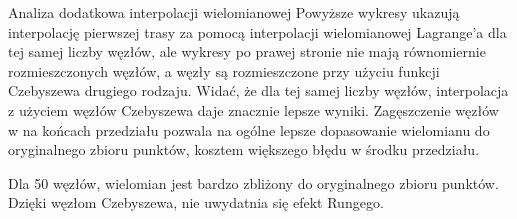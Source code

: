 \documentclass{article}
\begin{document}
\begin{section}{Analiza dodatkowa interpolacji wielomianowej}
  Powyższe wykresy ukazują interpolację pierwszej trasy za pomocą interpolacji wielomianowej Lagrange'a dla tej samej liczby
  węzłów, ale wykresy po prawej stronie nie mają równomiernie rozmieszczonych węzłów, a węzły są rozmieszczone
  przy użyciu funkcji Czebyszewa drugiego rodzaju. Widać, że dla tej samej liczby węzłów, interpolacja z użyciem
  węzłów Czebyszewa daje znacznie lepsze wyniki. Zagęszczenie węzłów w na końcach przedziału pozwala na ogólne
  lepsze dopasowanie wielomianu do oryginalnego zbioru punktów, kosztem większego błędu w środku przedziału.

  Dla 50 węzłów, wielomian jest bardzo zbliżony do oryginalnego zbioru punktów. Dzięki węzłom Czebyszewa, nie uwydatnia
  się efekt Rungego.

  \begin{figure}[H]
    \centering
  \end{figure}
  \begin{figure}[H]
    \centering

\end{figure}
\end{section}
\end{document}
